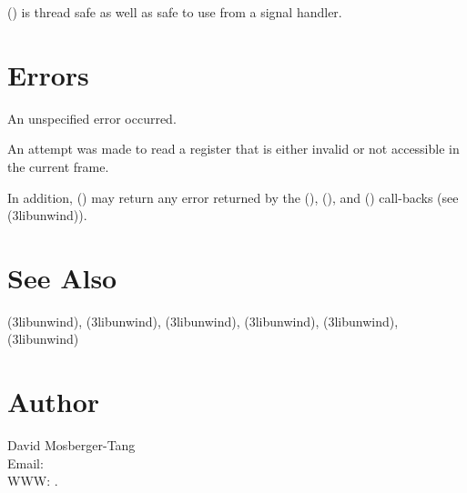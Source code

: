 \documentclass{article}
\begin{document}
() is thread safe as well as safe to use
from a signal handler.

\section{Errors}

\begin{Description}
\item[\Const{UNW\_EUNSPEC}] An unspecified error occurred.
\item[\Const{UNW\_EBADREG}] An attempt was made to read a register
  that is either invalid or not accessible in the current frame.
\end{Description}
In addition, () may return any error returned by
the (), (), and
() call-backs (see
(3libunwind)).

\section{See Also}

(3libunwind),
(3libunwind),
(3libunwind),
(3libunwind),
(3libunwind),
(3libunwind)

\section{Author}

\noindent
David Mosberger-Tang\\
Email: \\
WWW: .
\LatexManEnd
\end{document}
